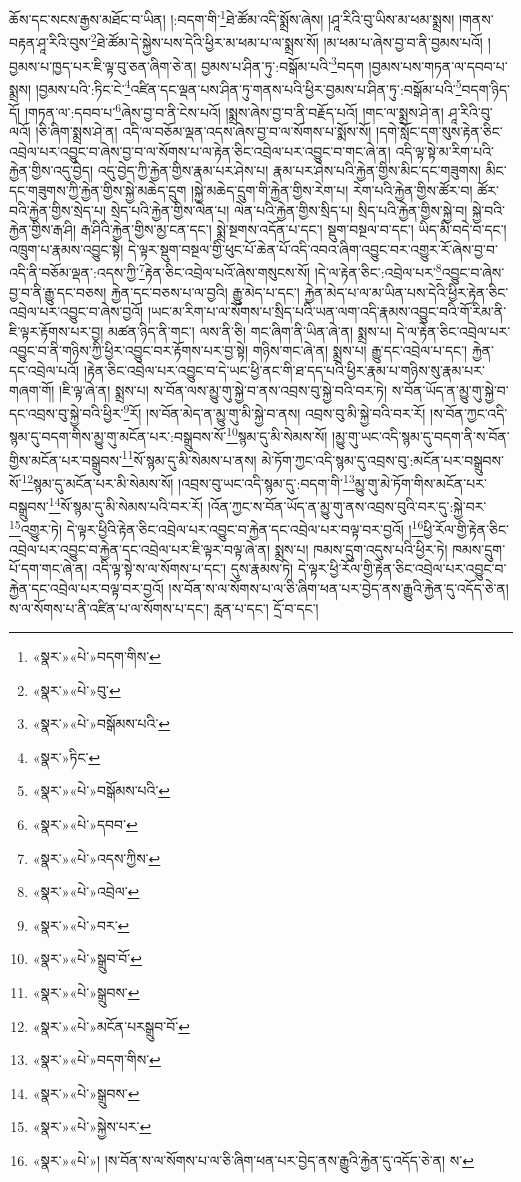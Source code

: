 ཆོས་དང་སངས་རྒྱས་མཐོང་བ་ཡིན། །:བདག་གི་\footnote{«སྣར་»«པེ་»བདག་གིས་}ཐེ་ཚོམ་འདི་སྨྲོས་ཞེས། །ཤཱ་རིའི་བུ་ཡིས་མ་ཕམ་སྨྲས། །གནས་བརྟན་ཤཱ་རིའི་བུས་\footnote{«སྣར་»«པེ་»བུ་}ཐེ་ཚོམ་དེ་སྐྱེས་པས་དེའི་ཕྱིར་མ་ཕམ་པ་ལ་སྨྲས་སོ། །མ་ཕམ་པ་ཞེས་བྱ་བ་ནི་བྱམས་པའོ། །བྱམས་པ་ཁྱད་པར་ཇི་ལྟ་བུ་ཅན་ཞིག་ཅེ་ན། བྱམས་པ་ཤིན་ཏུ་:བསྒོམ་པའི་\footnote{«སྣར་»«པེ་»བསྒོམས་པའི་}བདག །བྱམས་པས་གཏན་ལ་དབབ་པ་སྨྲས། །བྱམས་པའི་:ཏིང་ངེ་\footnote{«སྣར་»ཏིང་}འཛིན་དང་ལྡན་པས་ཤིན་ཏུ་གནས་པའི་ཕྱིར་བྱམས་པ་ཤིན་ཏུ་:བསྒོམ་པའི་\footnote{«སྣར་»«པེ་»བསྒོམས་པའི་}བདག་ཉིད་དོ། །གཏན་ལ་:དབབ་པ་\footnote{«སྣར་»«པེ་»དབབ་}ཞེས་བྱ་བ་ནི་ངེས་པའོ། །སྨྲས་ཞེས་བྱ་བ་ནི་བརྗོད་པའོ། །གང་ལ་སྨྲས་ཤེ་ན། ཤཱ་རིའི་བུ་ལའོ། །ཅི་ཞིག་སྨྲས་ཤེ་ན། འདི་ལ་བཅོམ་ལྡན་འདས་ཞེས་བྱ་བ་ལ་སོགས་པ་སྨོས་སོ། །དགེ་སློང་དག་སུས་རྟེན་ཅིང་འབྲེལ་པར་འབྱུང་བ་ཞེས་བྱ་བ་ལ་སོགས་པ་ལ་རྟེན་ཅིང་འབྲེལ་པར་འབྱུང་བ་གང་ཞེ་ན། འདི་ལྟ་སྟེ་མ་རིག་པའི་རྐྱེན་གྱིས་འདུ་བྱེད། འདུ་བྱེད་ཀྱི་རྐྱེན་གྱིས་རྣམ་པར་ཤེས་པ། རྣམ་པར་ཤེས་པའི་རྐྱེན་གྱིས་མིང་དང་གཟུགས། མིང་དང་གཟུགས་ཀྱི་རྐྱེན་གྱིས་སྐྱེ་མཆེད་དྲུག །སྐྱེ་མཆེད་དྲུག་གི་རྐྱེན་གྱིས་རེག་པ། རེག་པའི་རྐྱེན་གྱིས་ཚོར་བ། ཚོར་བའི་རྐྱེན་གྱིས་སྲེད་པ། སྲེད་པའི་རྐྱེན་གྱིས་ལེན་པ། ལེན་པའི་རྐྱེན་གྱིས་སྲིད་པ། སྲིད་པའི་རྐྱེན་གྱིས་སྐྱེ་བ། སྐྱེ་བའི་རྐྱེན་གྱིས་རྒ་ཤི། རྒ་ཤིའི་རྐྱེན་གྱིས་མྱ་ངན་དང་། སྨྲེ་སྔགས་འདོན་པ་དང་། སྡུག་བསྔལ་བ་དང་། ཡིད་མི་བདེ་བ་དང་། འཁྲུག་པ་རྣམས་འབྱུང་སྟེ། དེ་ལྟར་སྡུག་བསྔལ་གྱི་ཕུང་པོ་ཆེན་པོ་འདི་འབའ་ཞིག་འབྱུང་བར་འགྱུར་རོ་ཞེས་བྱ་བ་འདི་ནི་བཅོམ་ལྡན་:འདས་ཀྱི་\footnote{«སྣར་»«པེ་»འདས་ཀྱིས་}རྟེན་ཅིང་འབྲེལ་པའོ་ཞེས་གསུངས་སོ། །དེ་ལ་རྟེན་ཅིང་:འབྲེལ་པར་\footnote{«སྣར་»«པེ་»འབྲེལ་}འབྱུང་བ་ཞེས་བྱ་བ་ནི་རྒྱུ་དང་བཅས། རྐྱེན་དང་བཅས་པ་ལ་བྱའི། རྒྱུ་མེད་པ་དང་། རྐྱེན་མེད་པ་ལ་མ་ཡིན་པས་དེའི་ཕྱིར་རྟེན་ཅིང་འབྲེལ་པར་འབྱུང་བ་ཞེས་བྱའོ། །ཡང་མ་རིག་པ་ལ་སོགས་པ་སྲིད་པའི་ཡན་ལག་འདི་རྣམས་འབྱུང་བའི་གོ་རིམ་ནི་ཇི་ལྟར་རྟོགས་པར་བྱ། མཚན་ཉིད་ནི་གང་། ལས་ནི་ཅི། གང་ཞིག་ནི་ཡིན་ཞེ་ན། སྨྲས་པ། དེ་ལ་རྟེན་ཅིང་འབྲེལ་པར་འབྱུང་བ་ནི་གཉིས་ཀྱི་ཕྱིར་འབྱུང་བར་རྟོགས་པར་བྱ་སྟེ། གཉིས་གང་ཞེ་ན། སྨྲས་པ། རྒྱུ་དང་འབྲེལ་པ་དང་། རྐྱེན་དང་འབྲེལ་པའོ། །རྟེན་ཅིང་འབྲེལ་པར་འབྱུང་བ་དེ་ཡང་ཕྱི་ནང་གི་ཐ་དད་པའི་ཕྱིར་རྣམ་པ་གཉིས་སུ་རྣམ་པར་གཞག་གོ། །ཇི་ལྟ་ཞེ་ན། སྨྲས་པ། ས་བོན་ལས་མྱུ་གུ་སྐྱེ་བ་ནས་འབྲས་བུ་སྐྱེ་བའི་བར་ཏེ། ས་བོན་ཡོད་ན་མྱུ་གུ་སྐྱེ་བ་དང་འབྲས་བུ་སྐྱེ་བའི་ཕྱིར་\footnote{«སྣར་»«པེ་»བར་}རོ། །ས་བོན་མེད་ན་མྱུ་གུ་མི་སྐྱེ་བ་ནས། འབྲས་བུ་མི་སྐྱེ་བའི་བར་རོ། །ས་བོན་ཀྱང་འདི་སྙམ་དུ་བདག་གིས་མྱུ་གུ་མངོན་པར་:བསྒྲུབས་སོ་\footnote{«སྣར་»«པེ་»སྒྲུབ་བོ་}སྙམ་དུ་མི་སེམས་སོ། །མྱུ་གུ་ཡང་འདི་སྙམ་དུ་བདག་ནི་ས་བོན་གྱིས་མངོན་པར་བསྒྲུབས་\footnote{«སྣར་»«པེ་»སྒྲུབས་}སོ་སྙམ་དུ་མི་སེམས་པ་ནས། མེ་ཏོག་ཀྱང་འདི་སྙམ་དུ་འབྲས་བུ་:མངོན་པར་བསྒྲུབས་སོ་\footnote{«སྣར་»«པེ་»མངོན་པརསྒྲུབ་བོ་}སྙམ་དུ་མངོན་པར་མི་སེམས་སོ། །འབྲས་བུ་ཡང་འདི་སྙམ་དུ་:བདག་གི་\footnote{«སྣར་»«པེ་»བདག་གིས་}མྱུ་གུ་མེ་ཏོག་གིས་མངོན་པར་བསྒྲུབས་\footnote{«སྣར་»«པེ་»སྒྲུབས་}སོ་སྙམ་དུ་མི་སེམས་པའི་བར་རོ། །འོན་ཀྱང་ས་བོན་ཡོད་ན་མྱུ་གུ་ནས་འབྲས་བུའི་བར་དུ་:སྐྱེ་བར་\footnote{«སྣར་»«པེ་»སྐྱེས་པར་}འགྱུར་ཏེ། དེ་ལྟར་ཕྱིའི་རྟེན་ཅིང་འབྲེལ་པར་འབྱུང་བ་རྐྱེན་དང་འབྲེལ་པར་བལྟ་བར་བྱའོ། །\footnote{«སྣར་»«པེ་»། །ས་བོན་ས་ལ་སོགས་པ་ལ་ཅི་ཞིག་ཕན་པར་བྱེད་ནས་རྒྱུའི་རྐྱེན་དུ་འདོད་ཅེ་ན། ས་}ཕྱི་རོལ་གྱི་རྟེན་ཅིང་འབྲེལ་པར་འབྱུང་བ་རྐྱེན་དང་འབྲེལ་པར་ཇི་ལྟར་བལྟ་ཞེ་ན། སྨྲས་པ། ཁམས་དྲུག་འདུས་པའི་ཕྱིར་ཏེ། ཁམས་དྲུག་པོ་དག་གང་ཞེ་ན། འདི་ལྟ་སྟེ་ས་ལ་སོགས་པ་དང་། དུས་རྣམས་ཏེ། དེ་ལྟར་ཕྱི་རོལ་གྱི་རྟེན་ཅིང་འབྲེལ་པར་འབྱུང་བ་རྐྱེན་དང་འབྲེལ་པར་བལྟ་བར་བྱའོ། །ས་བོན་ས་ལ་སོགས་པ་ལ་ཅི་ཞིག་ཕན་པར་བྱེད་ནས་རྒྱུའི་རྐྱེན་དུ་འདོད་ཅེ་ན། ས་ལ་སོགས་པ་ནི་འཛིན་པ་ལ་སོགས་པ་དང་། རླན་པ་དང་། དྲོ་བ་དང་། 